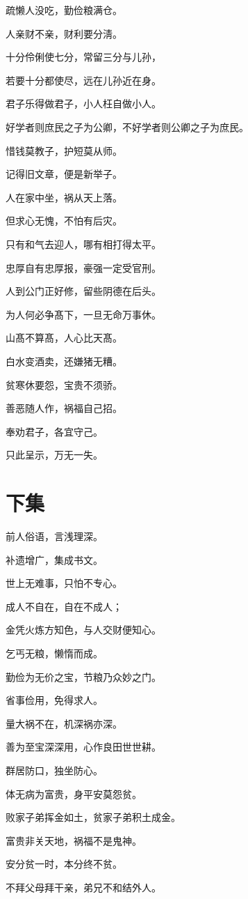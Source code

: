 \documentclass[12pt,oneside]{book}
\begin{document}
疏懒人没吃，勤俭粮满仓。

人亲财不亲，财利要分淸。

十分伶俐使七分，常留三分与儿孙，

若要十分都使尽，远在儿孙近在身。

君子乐得做君子，小人枉自做小人。

好学者则庶民之子为公卿，不好学者则公卿之子为庶民。

惜钱莫教子，护短莫从师。

记得旧文章，便是新举子。

人在家中坐，祸从天上落。

但求心无愧，不怕有后灾。

只有和气去迎人，哪有相打得太平。

忠厚自有忠厚报，豪强一定受官刑。

人到公门正好修，留些阴德在后头。

为人何必争髙下，一旦无命万事休。

山髙不算髙，人心比天髙。

白水变酒卖，还嫌猪无糟。

贫寒休要怨，宝贵不须骄。

善恶随人作，祸福自己招。

奉劝君子，各宜守己。

只此呈示，万无一失。

\section{下集}
前人俗语，言浅理深。

补遗增广，集成书文。

世上无难事，只怕不专心。

成人不自在，自在不成人；

金凭火炼方知色，与人交财便知心。

乞丐无粮，懒惰而成。

勤俭为无价之宝，节粮乃众妙之门。

省事俭用，免得求人。

量大祸不在，机深祸亦深。

善为至宝深深用，心作良田世世耕。

群居防口，独坐防心。

体无病为富贵，身平安莫怨贫。

败家子弟挥金如土，贫家子弟积土成金。

富贵非关天地，祸福不是鬼神。

安分贫一时，本分终不贫。

不拜父母拜干亲，弟兄不和结外人。
\end{document}
